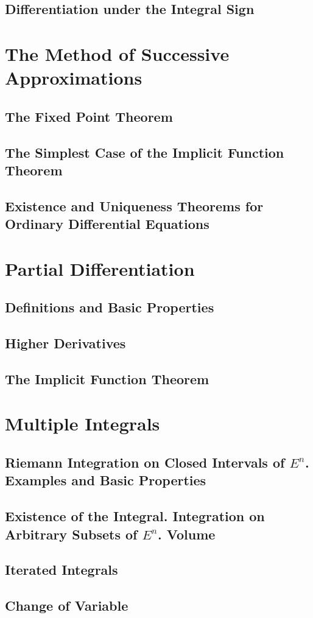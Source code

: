 \documentclass{article}
\begin{document}
		\subsection{Differentiation under the Integral Sign}
		
		
	\section{The Method of Successive Approximations}
		\subsection{The Fixed Point Theorem}
		
		\subsection{The Simplest Case of the Implicit Function Theorem}
		
		\subsection{Existence and Uniqueness Theorems for Ordinary Differential Equations}
	
	
	\section{Partial Differentiation}
		\subsection{Definitions and Basic Properties}
		
		\subsection{Higher Derivatives}
		
		\subsection{The Implicit Function Theorem}
	
	
	\section{Multiple Integrals}
		\subsection{Riemann Integration on Closed Intervals of $E^n$. Examples and Basic Properties}
		
		\subsection{Existence of the Integral. Integration on Arbitrary Subsets of $E^n$. Volume}
		
		\subsection{Iterated Integrals}
		
		\subsection{Change of Variable}


	
\end{document}
